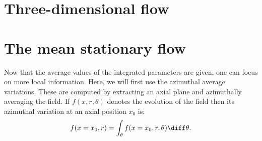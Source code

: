 \section{Three-dimensional flow}
\label{sec:ca_3D_flow}



\section{The mean stationary flow}
\label{sec:ca_general_flow_physics}

Now that the average values of the integrated parameters are given,
one can focus on more local information. Here, we will first use
the azimuthal average variations. These are computed by extracting
an axial plane and azimuthally averaging the field. If $f(x, r, \theta)$
denotes the evolution of the field then its azimuthal variation at
an axial position $x_0$ is:
\begin{equation}
    f(x=x_0, r) = \int_{\theta} f(x=x_0, r, \theta) \diff \theta.
\end{equation}




